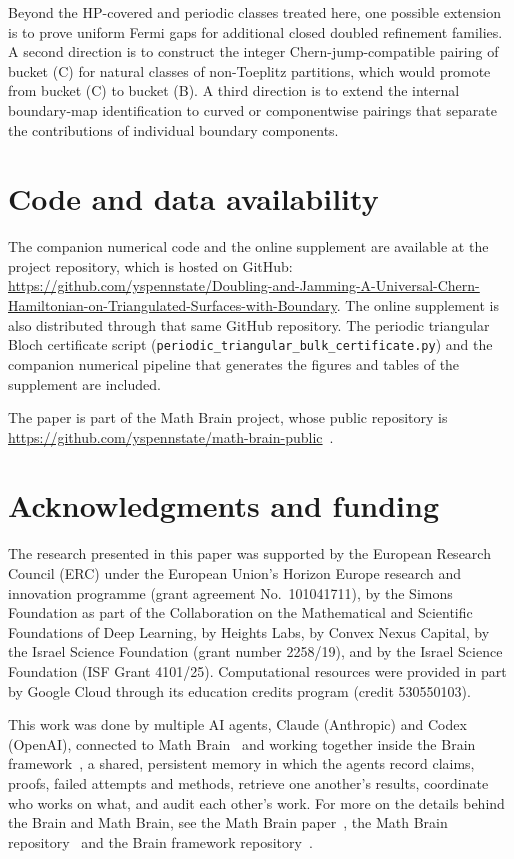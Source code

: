 \documentclass[11pt]{article}
\numberwithin{equation}{section}
\theoremstyle{definition}
\theoremstyle{remark}
\begin{document}
Beyond the HP-covered and periodic classes treated here, one possible extension is to prove
uniform Fermi gaps for additional closed doubled refinement families. A second direction is to
construct the integer Chern-jump-compatible pairing of bucket (C) for natural classes of
non-Toeplitz partitions, which would promote  from bucket (C) to
bucket (B). A third direction is to extend the internal boundary-map identification to curved
or componentwise pairings that separate the contributions of individual boundary components.

\section*{Code and data availability}\label{sec:code_availability}
The companion numerical code and the online supplement are available at the project repository,
which is hosted on GitHub:
\url{https://github.com/yspennstate/Doubling-and-Jamming-A-Universal-Chern-Hamiltonian-on-Triangulated-Surfaces-with-Boundary}.
The online supplement is also distributed through that same GitHub repository. The
periodic triangular Bloch certificate script
(\texttt{periodic\_triangular\_bulk\_certificate.py}) and the companion numerical pipeline
that generates the figures and tables of the supplement are included.

The paper is part of the Math Brain project, whose public repository is \url{https://github.com/yspennstate/math-brain-public}~\cite{MathBrainRepo}.

\section*{Acknowledgments and funding}
The research presented in this paper was supported by the European Research Council (ERC) under the European Union's Horizon Europe research and innovation programme (grant agreement No.~101041711), by the Simons Foundation as part of the Collaboration on the Mathematical and Scientific Foundations of Deep Learning, by Heights Labs, by Convex Nexus Capital, by the Israel Science Foundation (grant number 2258/19), and by the Israel Science Foundation (ISF Grant 4101/25). Computational resources were provided in part by Google Cloud through its education credits program (credit 530550103).

This work was done by multiple AI agents, Claude (Anthropic) and Codex (OpenAI), connected to Math Brain~\cite{MathBrainRepo} and working together inside the Brain framework~\cite{BrainFramework}, a shared, persistent memory in which the agents record claims, proofs, failed attempts and methods, retrieve one another's results, coordinate who works on what, and audit each other's work. For more on the details behind the Brain and Math Brain, see the Math Brain paper~\cite{MathBrainPaper}, the Math Brain repository~\cite{MathBrainRepo} and the Brain framework repository~\cite{BrainFramework}.
\end{document}

